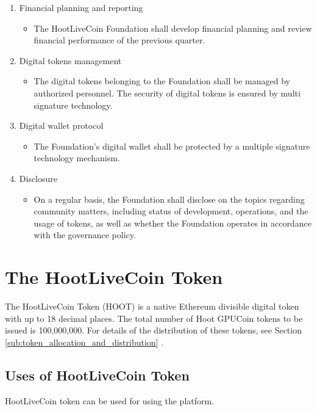 \documentclass{article}
\begin{document}
\begin{enumerate}
 \item Financial planning and reporting
 \begin{itemize}
 \item The HootLiveCoin Foundation shall develop financial planning and review financial performance of the previous quarter.
 \end{itemize}

 \item Digital tokens management
 \begin{itemize}
 \item The digital tokens belonging to the Foundation shall be managed by authorized personnel. The security of digital tokens is ensured by multi signature technology.
 \end{itemize}

 \item Digital wallet protocol
 \begin{itemize}
 \item The Foundation’s digital wallet shall be protected by a multiple signature technology mechanism.
 \end{itemize}

 \item Disclosure
 \begin{itemize}
 \item On a regular basis, the Foundation shall disclose on the topics regarding community matters, including status of development, operations, and the usage of tokens, as well as whether the Foundation operates in accordance with the governance policy.
 \end{itemize}
\end{enumerate}


\section{The HootLiveCoin Token}
The HootLiveCoin Token (HOOT) is a native Ethereum divisible digital token with up to 18 decimal places. The total number of Hoot GPUCoin tokens to be issued is 100,000,000. For details of the distribution of these tokens, see Section \ref{sub:token_allocation_and_distribution} .

\subsection{Uses of HootLiveCoin Token} %
\label{sub:uses_of_hoot_token}
HootLiveCoin token can be used for using the platform.
\end{document}
